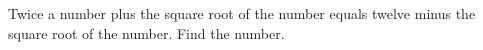 Twice a number plus the square root of the number equals twelve minus the square root of the number. Find the number.
